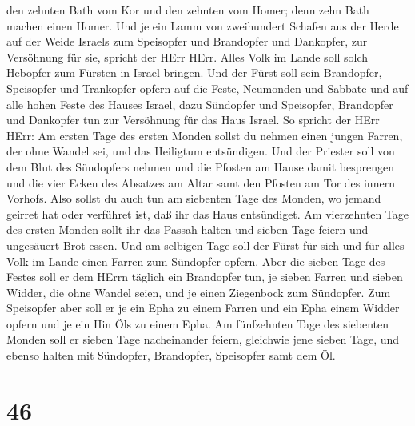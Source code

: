 den zehnten Bath vom Kor und den zehnten vom Homer; denn zehn Bath
machen einen Homer.  Und je ein Lamm von zweihundert
Schafen aus der Herde auf der Weide Israels zum Speisopfer und
Brandopfer und Dankopfer, zur Versöhnung für sie, spricht der HErr HErr.
 Alles Volk im Lande soll solch Hebopfer zum Fürsten in
Israel bringen.  Und der Fürst soll sein Brandopfer,
Speisopfer und Trankopfer opfern auf die Feste, Neumonden und Sabbate
und auf alle hohen Feste des Hauses Israel, dazu Sündopfer und
Speisopfer, Brandopfer und Dankopfer tun zur Versöhnung für das Haus
Israel.  So spricht der HErr HErr: Am ersten Tage des
ersten Monden sollst du nehmen einen jungen Farren, der ohne Wandel sei,
und das Heiligtum entsündigen.  Und der Priester soll von
dem Blut des Sündopfers nehmen und die Pfosten am Hause damit besprengen
und die vier Ecken des Absatzes am Altar samt den Pfosten am Tor des
innern Vorhofs.  Also sollst du auch tun am siebenten Tage
des Monden, wo jemand geirret hat oder verführet ist, daß ihr das Haus
entsündiget.  Am vierzehnten Tage des ersten Monden sollt
ihr das Passah halten und sieben Tage feiern und ungesäuert Brot essen.
 Und am selbigen Tage soll der Fürst für sich und für alles
Volk im Lande einen Farren zum Sündopfer opfern.  Aber die
sieben Tage des Festes soll er dem HErrn täglich ein Brandopfer tun, je
sieben Farren und sieben Widder, die ohne Wandel seien, und je einen
Ziegenbock zum Sündopfer.  Zum Speisopfer aber soll er je
ein Epha zu einem Farren und ein Epha einem Widder opfern und je ein Hin
Öls zu einem Epha.  Am fünfzehnten Tage des siebenten
Monden soll er sieben Tage nacheinander feiern, gleichwie jene sieben
Tage, und ebenso halten mit Sündopfer, Brandopfer, Speisopfer samt dem
Öl.

\hypertarget{section-45}{%
\section{46}\label{section-45}}

